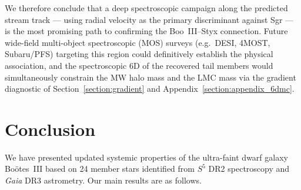 \documentclass[twocolumn, apj, numberedappendix, appendixfloats]{openjournal_dhayaa}
\newcommand{\SSSSS}{${S}^5$\xspace}
\newcommand{\gaia}{\textit{Gaia}\xspace}
\newcommand{\boo}{Bo\"{o}tes~III\xspace}
\begin{document}
We therefore conclude that a deep spectroscopic campaign along the predicted stream track --- using radial velocity as the primary discriminant against Sgr --- is the most promising path to confirming the Boo~III--Styx connection. Future wide-field multi-object spectroscopic (MOS) surveys (e.g.\ DESI, 4MOST, Subaru/PFS) targeting this region could definitively establish the physical association, and the spectroscopic 6D of the recovered tail members would simultaneously constrain the MW halo mass and the LMC mass via the gradient diagnostic of Section~\ref{section:gradient} and Appendix~\ref{section:appendix_6dmc}.


\section{Conclusion}\label{section:conclusion}

We have presented updated systemic properties of the ultra-faint dwarf galaxy \boo based on 24 member stars identified from \SSSSS DR2 spectroscopy and \gaia DR3 astrometry. Our main results are as follows.
\end{document}

